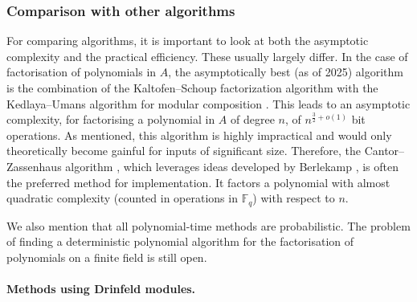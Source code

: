 \documentclass[11pt]{article}
\theoremstyle{definition}
\newcommand\Fq{\mathbb{F}_q}
\begin{document}
\subsubsection{Comparison with other algorithms}
\label{facto:compar}
For comparing algorithms, it is important to look at both the asymptotic
complexity and the practical efficiency. These usually largely differ. In the
case of factorisation of polynomials in $A$, the asymptotically best (as of
2025) algorithm is the combination of the Kaltofen--Schoup factorization algorithm \cite{kaltofen_subquadratic-time_1995} with the Kedlaya--Umans algorithm for modular composition \cite{kedlaya_fast_2011}. This leads to an asymptotic complexity, for factorising a polynomial in $A$ of degree $n$, of $n^{\frac 3 2 + o(1)}$ bit operations. As mentioned, this algorithm is highly impractical and would
only theoretically become gainful for inputs of significant size. Therefore,
the Cantor--Zassenhaus algorithm \cite{cantor_new_1981}, which leverages ideas developed by Berlekamp \cite{berlekamp_factoring_1967}, is often the
preferred method for implementation. It factors a polynomial with almost quadratic complexity (counted in operations in $\Fq$) with respect to $n$.

We also mention that all polynomial-time methods are probabilistic. The problem of finding a deterministic polynomial algorithm for the factorisation of polynomials on a finite field is still open.

\paragraph{Methods using Drinfeld modules.}
\end{document}
